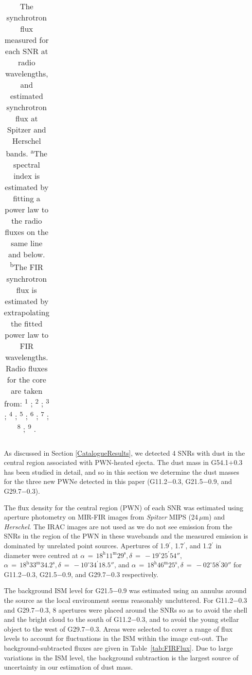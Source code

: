 \documentclass[fleqn,usenatbib]{mnras}
\begin{document}
{\begin{table*}
\begin{tabular}{c c c c c c c}
	\end{tabular}
	\caption{
	The synchrotron flux measured for each SNR at radio wavelengths, and estimated synchrotron flux at Spitzer and Herschel bands.
	\textsuperscript{a}The spectral index is estimated by fitting a power law to the radio fluxes on the same line and below.
	\textsuperscript{b}The FIR synchrotron flux is estimated by extrapolating the fitted power law to FIR wavelengths.
	Radio fluxes for the core are taken from:
	\textsuperscript{1} \citet{Kothes2001};
	\textsuperscript{2} \citet{Bietenholz2011};
	\textsuperscript{3} \citet{Bietenholz2008};
	\textsuperscript{4} \citet{Morsi1987};
	\textsuperscript{5} \citet{Planck2016beta};
	\textsuperscript{6} \citet{Salter1989ApJ};
	\textsuperscript{7} \citet{Salter1989AA};
	\textsuperscript{8} \citet{Becker1984};
	\textsuperscript{9} \citet{Bock2005}.}
	\label{tab:Flux}
\end{table*}

As discussed in Section \ref{CatalogueResults}, we detected 4 SNRs with dust in the central region associated with PWN-heated ejecta. The dust mass in G54.1$+$0.3 has been studied in detail, and so in this section we determine the dust masses for the three new PWNe detected in this paper (G11.2$-$0.3, G21.5$-$0.9, and G29.7$-$0.3).

The flux density for the central region (PWN) of each SNR was estimated using aperture photometry on MIR-FIR images from  \textit{Spitzer} MIPS (24\,$\mu$m) and \textit{Herschel}. The IRAC images are not used as we do not see emission from the SNRs in the region of the PWN in these wavebands and the measured emission is dominated by unrelated point sources. Apertures of 1.9$^\prime$, 1.7$^\prime$, and 1.2$^\prime$ in diameter were centred at $\alpha\,=\,18^\text{h}11^\text{m}29^\text{s}, \delta\,=\,-19^\circ25^\prime54''$, $\alpha\,=\,18^\text{h}33^\text{m}34.2^\text{s}, \delta\,=\,-10^\circ34^\prime18.5''$, and $\alpha\,=\,18^\text{h}46^\text{m}25^\text{s}, \delta\,=\,-02^\circ58^\prime30''$ for G11.2$-$0.3, G21.5$-$0.9, and G29.7$-$0.3 respectively.

The background ISM level for G21.5$-$0.9 was estimated using an annulus around the source as the local environment seems reasonably uncluttered. For G11.2$-$0.3 and G29.7$-$0.3, 8 apertures were placed around the SNRs so as to avoid the shell and the bright cloud to the south of G11.2$-$0.3, and to avoid the young stellar object to the west of G29.7$-$0.3. Areas were selected to cover a range of flux levels to account for fluctuations in the ISM within the image cut-out. The background-subtracted fluxes are given in Table~\ref{tab:FIRFlux}. Due to large variations in the ISM level, the background subtraction is the largest source of uncertainty in our estimation of dust mass.

}
\end{document}
